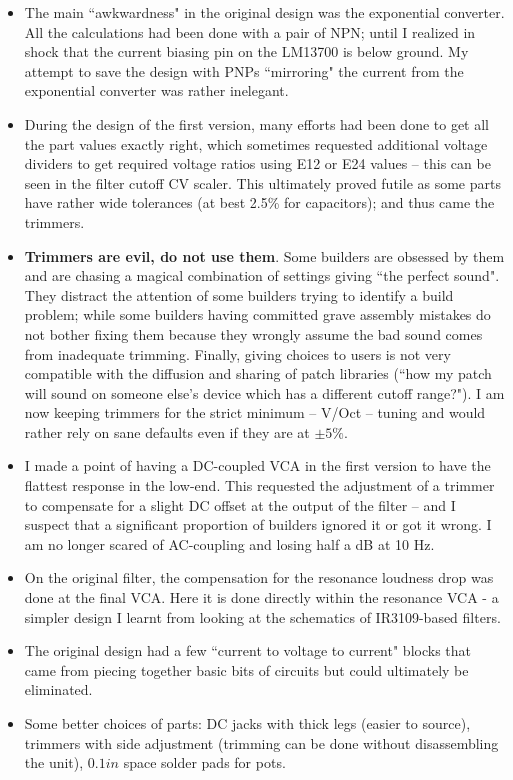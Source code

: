 \documentclass[a4paper,11pt]{article}
\begin{document}
\begin{itemize}
\item The main ``awkwardness" in the original design was the exponential converter. All the calculations had been done with a pair of NPN; until I realized in shock that the current biasing pin on the LM13700 is below ground. My attempt to save the design with PNPs ``mirroring" the current from the exponential converter was rather inelegant.
\item During the design of the first version, many efforts had been done to get all the part values exactly right, which sometimes requested additional voltage dividers to get required voltage ratios using E12 or E24 values -- this can be seen in the filter cutoff CV scaler. This ultimately proved futile as some parts have rather wide tolerances (at best 2.5\% for capacitors); and thus came the trimmers.
\item \textbf{Trimmers are evil, do not use them}. Some builders are obsessed by them and are chasing a magical combination of settings giving ``the perfect sound". They distract the attention of some builders trying to identify a build problem; while some builders having committed grave assembly mistakes do not bother fixing them because they wrongly assume the bad sound comes from inadequate trimming. Finally, giving choices to users is not very compatible with the diffusion and sharing of patch libraries (``how my patch will sound on someone else's device which has a different cutoff range?"). I am now keeping trimmers for the strict minimum -- V/Oct -- tuning and would rather rely on sane defaults even if they are at $\pm 5\%$.
\item I made a point of having a DC-coupled VCA in the first version to have the flattest response in the low-end. This requested the adjustment of a trimmer to compensate for a slight DC offset at the output of the filter -- and I suspect that a significant proportion of builders ignored it or got it wrong. I am no longer scared of AC-coupling and losing half a dB at 10 Hz.
\item On the original filter, the compensation for the resonance loudness drop was done at the final VCA. Here it is done directly within the resonance VCA - a simpler design I learnt from looking at the schematics of IR3109-based filters.
\item The original design had a few ``current to voltage to current" blocks that came from piecing together basic bits of circuits but could ultimately be eliminated.
\item Some better choices of parts: DC jacks with thick legs (easier to source), trimmers with side adjustment (trimming can be done without disassembling the unit), $0.1in$ space solder pads for pots.
\end{itemize}
\end{document}
